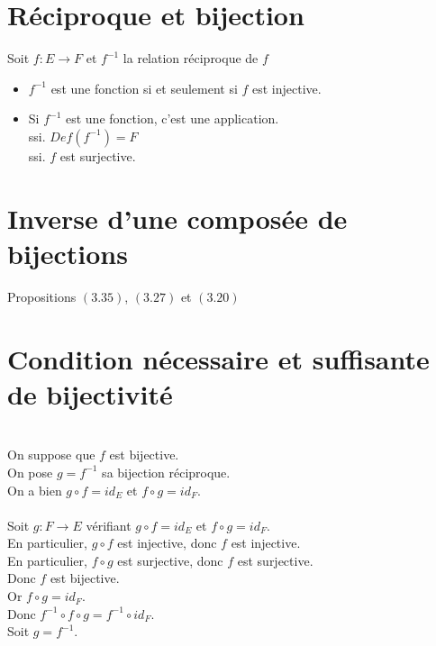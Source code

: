 \documentclass[../main.tex]{subfiles}
\begin{document}
\section{Réciproque et bijection}
Soit $f:E \rightarrow F$ et $f^{-1}$ la relation réciproque de $f$
\begin{itemize}
    \item $f^{-1}$ est une fonction si et seulement si $f$ est injective. 
    \item Si $f^{-1}$ est une fonction, c'est une application. \\
    ssi. $Def(f^{-1}) = F$ \\
    ssi. $f$ est surjective.
\end{itemize}

\section{Inverse d'une composée de bijections}
Propositions $(3.35)$, $(3.27)$ et $(3.20)$

\section{Condition nécessaire et suffisante de bijectivité}
\boxed{\Rightarrow} \\
On suppose que $f$ est bijective. \\
On pose $g = f^{-1}$ sa bijection réciproque. \\
On a bien $g \circ f = id_E$ et $f \circ g = id_F$. \\

\boxed{\Leftarrow} \\
Soit $g:F \rightarrow E$ vérifiant $g \circ f = id_E$ et $f \circ g = id_F$. \\
En particulier, $g \circ f$ est injective, donc $f$ est injective. \\
En particulier, $f \circ g$ est surjective, donc $f$ est surjective. \\
Donc $f$ est bijective. \\
Or $f \circ g = id_F$. \\
Donc $f^{-1} \circ f \circ g = f^{-1} \circ id_F$. \\
Soit $g = f^{-1}$.
\end{document}
